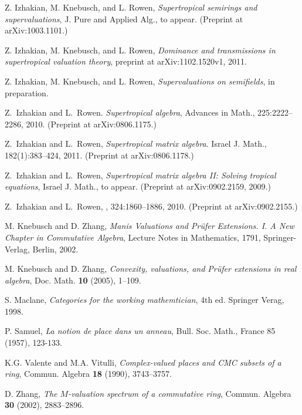\documentclass [12pt,a4paper,reqno]{amsart}
\begin{document}
\begin{thebibliography}{IMS}
  Z. Izhakian, M. Knebusch, and L. Rowen, \textit{Supertropical semirings and
supervaluations}, J. Pure and Applied Alg., to appear. (Preprint
at arXiv:1003.1101.)

  Z. Izhakian, M. Knebusch, and L. Rowen,
\textit{Dominance and transmissions in supertropical valuation
theory}, preprint at arXiv:1102.1520v1, 2011.

  Z. Izhakian, M. Knebusch, and L. Rowen, \textit{Supervaluations
on semifields}, in preparation.

Z.~Izhakian and L.~Rowen.
\newblock \textit{Supertropical algebra}, Advances in Math., 225:2222--2286, 2010.
\newblock (Preprint at arXiv:0806.1175.)

Z.~Izhakian and L.~Rowen,
\newblock \textit{Supertropical matrix algebra}.
\newblock  Israel J. Math.,  182(1):383--424, 2011.
\newblock (Preprint at arXiv:0806.1178.)

Z.~Izhakian and L.~Rowen,
\newblock \textit{Supertropical matrix algebra II: Solving tropical
equations},
\newblock  Israel J. Math., to appear.
\newblock (Preprint at arXiv:0902.2159, 2009.)

Z.~Izhakian and L.~Rowen,
, 324:1860--1886, 2010. (Preprint at arXiv:0902.2155.)

   M. Knebusch and D. Zhang, \textit{Manis Valuations and Pr\"ufer Extensions.
   I.
  A New Chapter in Commutative Algebra}, Lecture Notes in Mathematics, 1791, Springer-Verlag,
   Berlin, 2002.

  M. Knebusch and D. Zhang, \textit{Convexity, valuations, and
Pr\"ufer extensions in real algebra}, Doc. Math. \textbf{10}
(2005), 1--109.

 S. Maclane, \textit{Categories for the working mathemtician}, 4th ed.
Springer Verag, 1998.

 P. Samuel, \textit{ La notion de place dans
un anneau}, Bull. Soc. Math., France 85 (1957), 123-133.

  K.G. Valente and M.A. Vitulli, \textit{Complex-valued places and CMC
subsets of a ring}, Commun. Algebra   \textbf{18} (1990),
3743--3757.

  D. Zhang, \textit{The $M$-valuation spectrum of a commutative
ring}, Commun. Algebra \textbf{30} (2002), 2883--2896.

\end{thebibliography}
\end{document}
